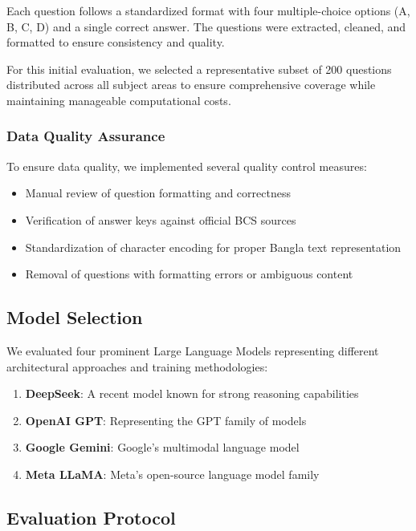 \documentclass[11pt,a4paper]{article}
\begin{document}
Each question follows a standardized format with four multiple-choice options (A, B, C, D) and a single correct answer. The questions were extracted, cleaned, and formatted to ensure consistency and quality.

For this initial evaluation, we selected a representative subset of 200 questions distributed across all subject areas to ensure comprehensive coverage while maintaining manageable computational costs.

\subsubsection{Data Quality Assurance}

To ensure data quality, we implemented several quality control measures:

\begin{itemize}
    \item Manual review of question formatting and correctness
    \item Verification of answer keys against official BCS sources
    \item Standardization of character encoding for proper Bangla text representation
    \item Removal of questions with formatting errors or ambiguous content
\end{itemize}

\subsection{Model Selection}

We evaluated four prominent Large Language Models representing different architectural approaches and training methodologies:

\begin{enumerate}
    \item \textbf{DeepSeek}: A recent model known for strong reasoning capabilities
    \item \textbf{OpenAI GPT}: Representing the GPT family of models
    \item \textbf{Google Gemini}: Google's multimodal language model
    \item \textbf{Meta LLaMA}: Meta's open-source language model family
\end{enumerate}

\subsection{Evaluation Protocol}
\end{document}
